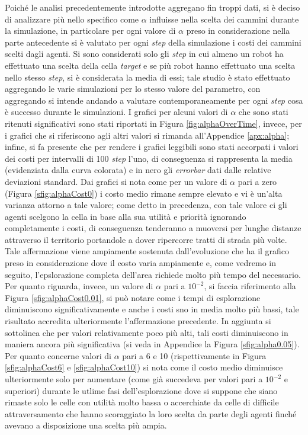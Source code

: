 Poiché le analisi precedentemente introdotte aggregano fin troppi dati, si è deciso di analizzare più nello specifico come $\alpha$ influisse nella scelta dei cammini durante la simulazione, in particolare per ogni valore di $\alpha$ preso in considerazione nella parte antecedente si è valutato per ogni \textit{step} della simulazione i costi dei cammini scelti dagli agenti.
Si sono considerati solo gli \textit{step} in cui almeno un robot ha effettuato una scelta della cella \textit{target} e se più robot hanno effettuato una scelta nello stesso \textit{step}, si è considerata la media di essi; tale studio è stato effettuato aggregando le varie simulazioni per lo stesso valore del parametro, con aggregando si intende andando a valutare contemporaneamente per ogni \textit{step} cosa è successo durante le simulazioni.
I grafici per alcuni valori di $\alpha$ che sono stati ritenuti significativi sono stati riportati in Figura \ref{fig:alphaOverTime}, invece, per i grafici che si riferiscono agli altri valori si rimanda all'Appendice \ref{apx:alpha}; infine, si fa presente che per rendere i grafici leggibili sono stati accorpati i valori dei costi per intervalli di 100 \textit{step} l'uno, di conseguenza si rappresenta la media (evidenziata dalla curva colorata) e in nero gli \textit{errorbar} dati dalle relative deviazioni standard.
Dai grafici si nota come per un valore di $\alpha$ pari a zero (Figura \ref{sfig:alphaCost0}) i costo medio rimane sempre elevato e vi è un'alta varianza attorno a tale valore; come detto in precedenza, con tale valore ci gli agenti scelgono la cella in base alla sua utilità e priorità ignorando completamente i costi, di conseguenza tenderanno a muoversi per lunghe distanze attraverso il territorio portandole a dover ripercorre tratti di strada più volte.
Tale affermazione viene ampiamente sostenuta dall'evoluzione che ha il grafico preso in considerazione dove il costo varia ampiamente e, come vedremo in seguito, l'epslorazione completa dell'area richiede molto più tempo del necessario.
Per quanto riguarda, invece, un valore di $\alpha$ pari a $10^{-2}$, si faccia riferimento alla Figura \ref{sfig:alphaCost0.01}, si può notare come i tempi di esplorazione diminuiscono significativamente e anche i costi sno in media molto più bassi, tale risultato accredita ulteriormente l'affermazione precedente.
In aggiunta si sottolinea che per valori relativamente poco più alti, tali costi diminuiscono in maniera ancora più significativa (si veda in Appendice la Figura \ref{sfig:alpha0.05}).
Per quanto concerne valori di $\alpha$ pari a 6 e 10 (rispettivamente in Figura \ref{sfig:alphaCost6} e \ref{sfig:alphaCost10}) si nota come il costo medio diminuisce ulteriormente solo per aumentare (come già succedeva per valori pari a $10^{-2}$ e superiori) durante le utlime fasi dell'esplorazione dove si suppone che siano rimaste solo le celle con utilità molto bassa o accerchiate da celle di difficile attraversamento che hanno scoraggiato la loro scelta da parte degli agenti finché avevano a disposizione una scelta più ampia.
